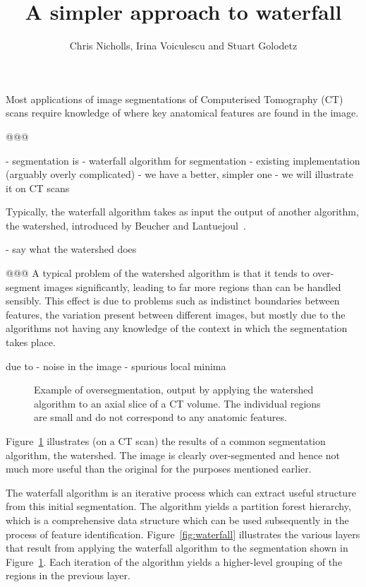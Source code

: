 \documentclass{ouclprgsc}
\title{\LARGE \bf
A simpler approach to waterfall
}
\author{Chris Nicholls, Irina Voiculescu and Stuart Golodetz
}
\institute{Oxford University Computing Laboratory}
\begin{document}
\maketitle
\pagestyle{empty}



Most applications of image segmentations of Computerised Tomography
(CT) scans require knowledge of where key anatomical features are
found in the image. 

@@@

 - segmentation is
 - waterfall algorithm for segmentation 
 - existing implementation (arguably overly complicated)
 - we have a better, simpler one
 - we will illustrate it on CT scans


Typically, the waterfall algorithm takes as input the output of
another algorithm, the watershed, introduced by Beucher and
Lantuejoul~\cite{beucher79}. 

 - say what the watershed does

@@@ A typical problem of the watershed algorithm is that it tends to
over-segment images significantly, leading to far more regions than
can be handled sensibly. This effect is due to problems such as
indistinct boundaries between features, the variation present between
different images, but mostly due to the algorithms not having any
knowledge of the context in which the segmentation takes place.

due to
 - noise in the image
 - spurious local minima


\begin{figure}
\centering
\ifpdf
        \hspace{1mm}%
\else
\fi
\caption{Example of oversegmentation, output by applying the watershed
  algorithm to an axial slice of a CT volume. The individual regions
  are small and do not correspond to any anatomic features.}
\label{fig:oversegmented}
\end{figure}

Figure~\ref{fig:oversegmented} illustrates (on a CT scan) the results
of a common segmentation algorithm, the watershed. The image is
clearly over-segmented and hence not much more useful than the
original for the purposes mentioned earlier. 

The waterfall algorithm is an iterative process which can extract
useful structure from this initial segmentation. The algorithm yields
a partition forest hierarchy, which is a comprehensive data structure
which can be used subsequently in the process of feature
identification.  Figure~\ref{fig:waterfall} illustrates the various
layers that result from applying the waterfall algorithm to the
segmentation shown in Figure~\ref{fig:oversegmented}.  Each iteration
of the algorithm yields a higher-level grouping of the regions in the
previous layer.
\end{document}
